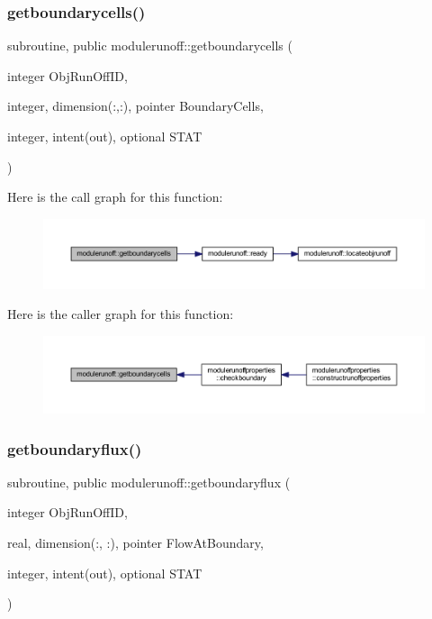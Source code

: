 \subsubsection{\texorpdfstring{getboundarycells()}{getboundarycells()}}
{\footnotesize\ttfamily subroutine, public modulerunoff\+::getboundarycells (\begin{DoxyParamCaption}\item[{integer}]{Obj\+Run\+Off\+ID,  }\item[{integer, dimension(\+:,\+:), pointer}]{Boundary\+Cells,  }\item[{integer, intent(out), optional}]{S\+T\+AT }\end{DoxyParamCaption})}

Here is the call graph for this function\+:\nopagebreak
\begin{figure}[H]
\begin{center}
\leavevmode
\includegraphics[width=350pt]{namespacemodulerunoff_a94d1c021f061e9cfa1f07c3845541525_cgraph}
\end{center}
\end{figure}
Here is the caller graph for this function\+:\nopagebreak
\begin{figure}[H]
\begin{center}
\leavevmode
\includegraphics[width=350pt]{namespacemodulerunoff_a94d1c021f061e9cfa1f07c3845541525_icgraph}
\end{center}
\end{figure}
\mbox{\label{namespacemodulerunoff_aa5c3e304953e0e305461bb0ef472e0f8}} 
\subsubsection{\texorpdfstring{getboundaryflux()}{getboundaryflux()}}
{\footnotesize\ttfamily subroutine, public modulerunoff\+::getboundaryflux (\begin{DoxyParamCaption}\item[{integer}]{Obj\+Run\+Off\+ID,  }\item[{real, dimension(\+:, \+:), pointer}]{Flow\+At\+Boundary,  }\item[{integer, intent(out), optional}]{S\+T\+AT }\end{DoxyParamCaption})}

